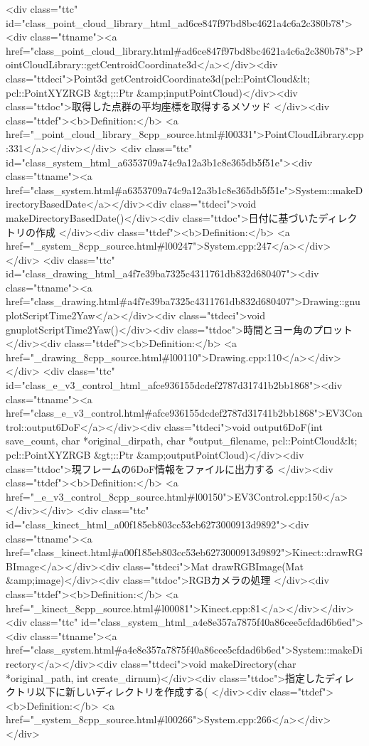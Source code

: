 <div class="ttc" id="class_point_cloud_library_html_ad6ce847f97bd8bc4621a4c6a2c380b78"><div class="ttname"><a href="class_point_cloud_library.html#ad6ce847f97bd8bc4621a4c6a2c380b78">PointCloudLibrary::getCentroidCoordinate3d</a></div><div class="ttdeci">Point3d getCentroidCoordinate3d(pcl::PointCloud&lt; pcl::PointXYZRGB &gt;::Ptr &amp;inputPointCloud)</div><div class="ttdoc">取得した点群の平均座標を取得するメソッド </div><div class="ttdef"><b>Definition:</b> <a href="_point_cloud_library_8cpp_source.html#l00331">PointCloudLibrary.cpp:331</a></div></div>
<div class="ttc" id="class_system_html_a6353709a74c9a12a3b1c8e365db5f51e"><div class="ttname"><a href="class_system.html#a6353709a74c9a12a3b1c8e365db5f51e">System::makeDirectoryBasedDate</a></div><div class="ttdeci">void makeDirectoryBasedDate()</div><div class="ttdoc">日付に基づいたディレクトリの作成 </div><div class="ttdef"><b>Definition:</b> <a href="_system_8cpp_source.html#l00247">System.cpp:247</a></div></div>
<div class="ttc" id="class_drawing_html_a4f7e39ba7325c4311761db832d680407"><div class="ttname"><a href="class_drawing.html#a4f7e39ba7325c4311761db832d680407">Drawing::gnuplotScriptTime2Yaw</a></div><div class="ttdeci">void gnuplotScriptTime2Yaw()</div><div class="ttdoc">時間とヨー角のプロット </div><div class="ttdef"><b>Definition:</b> <a href="_drawing_8cpp_source.html#l00110">Drawing.cpp:110</a></div></div>
<div class="ttc" id="class_e_v3_control_html_afce936155dcdef2787d31741b2bb1868"><div class="ttname"><a href="class_e_v3_control.html#afce936155dcdef2787d31741b2bb1868">EV3Control::output6DoF</a></div><div class="ttdeci">void output6DoF(int save_count, char *original_dirpath, char *output_filename, pcl::PointCloud&lt; pcl::PointXYZRGB &gt;::Ptr &amp;outputPointCloud)</div><div class="ttdoc">現フレームの6DoF情報をファイルに出力する </div><div class="ttdef"><b>Definition:</b> <a href="_e_v3_control_8cpp_source.html#l00150">EV3Control.cpp:150</a></div></div>
<div class="ttc" id="class_kinect_html_a00f185eb803cc53eb6273000913d9892"><div class="ttname"><a href="class_kinect.html#a00f185eb803cc53eb6273000913d9892">Kinect::drawRGBImage</a></div><div class="ttdeci">Mat drawRGBImage(Mat &amp;image)</div><div class="ttdoc">RGBカメラの処理 </div><div class="ttdef"><b>Definition:</b> <a href="_kinect_8cpp_source.html#l00081">Kinect.cpp:81</a></div></div>
<div class="ttc" id="class_system_html_a4e8e357a7875f40a86cee5cfdad6b6ed"><div class="ttname"><a href="class_system.html#a4e8e357a7875f40a86cee5cfdad6b6ed">System::makeDirectory</a></div><div class="ttdeci">void makeDirectory(char *original_path, int create_dirnum)</div><div class="ttdoc">指定したディレクトリ以下に新しいディレクトリを作成する( </div><div class="ttdef"><b>Definition:</b> <a href="_system_8cpp_source.html#l00266">System.cpp:266</a></div></div>

